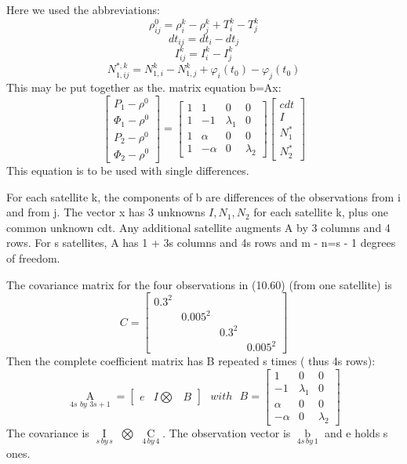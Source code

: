 Here we used the abbreviations:
$$
\rho_{ij}^{0}=\rho_{i}^{k}-\rho_{j}^{k}+T_{i}^{k}-T_{j}^{k}
$$
$$
dt_{ij}=dt_{i}-dt_{j}
$$
$$
I_{ij}^{k}=I_{i}^{k}-I_{j}^{k}
$$
$$
N_{1,ij}^{*,k}=N_{1,i}^{k}-N_{1,j}^{k}+\varphi_{i}(t_{0})-\varphi_{j}(t_{0})
$$
This may be put together as the. matrix equation b=Ax:
\begin{equation}
\begin{bmatrix}
P_{1}-\rho^{0}\\
\Phi_{1}-\rho^{0}\\
P_{2}-\rho^{0}\\
\Phi_{2}-\rho^{0}
\end{bmatrix}
=\begin{bmatrix}
1&1&0&0\\
1&-1&\lambda_{1}&0\\
1&\alpha&0&0\\
1&-\alpha&0&\lambda_{2}
\end{bmatrix}
\begin{bmatrix}
cdt\\I\\N_{1}^{*}\\N_{2}^{*}
\end{bmatrix}
\end{equation}
This equation is to be used with single differences.

For each satellite k, the components of b are differences of the observations from i and from j. The vector x has 3 unknowns $I,N_{1},N_{2}$ for each satellite k, plus one common unknown cdt. Any additional satellite augments A by 3 columns and 4 rows. For s satellites, A has 1 + 3s columns and 4s rows and m - n=s - 1 degrees of freedom.

The covariance matrix for the four observations in (10.60) (from one satellite) is
$$
C=\begin{bmatrix}
0.3^{2}&&&\\
&0.005^{2}&&\\
&&0.3^{2}&\\
&&&0.005^{2}
\end{bmatrix}
$$
Then the complete coefficient matrix has B repeated s times ( thus 4s rows):
\begin{equation}
\mathop{A}\limits_{4s\,\,by\,\,3s+1}=
\begin{bmatrix}
e&I\bigotimes&B
\end{bmatrix}\,\,\,\,with \,\,\,\,
B=\begin{bmatrix}
1&0&0\\
-1&\lambda_{1}&0\\
\alpha&0&0\\
-\alpha&0&\lambda_{2}
\end{bmatrix}
\end{equation}
The covariance is $\mathop{I}\limits_{s\,by\,s}$ $\bigotimes$ $\mathop{C}\limits_{4\,by\,4}$. The observation vector is $\mathop{b}\limits_{4s\, by\, 1}$ and e holds s ones.


